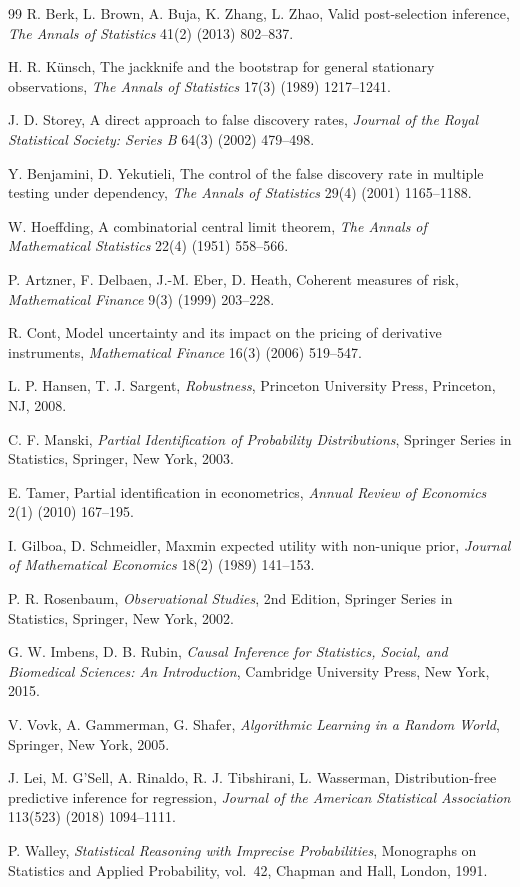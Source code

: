 \documentclass[preprint,12pt]{elsarticle}
\theoremstyle{definition}
\begin{document}
\begin{thebibliography}{99}
R. Berk, L. Brown, A. Buja, K. Zhang, L. Zhao, Valid post-selection inference,
\emph{The Annals of Statistics} 41(2) (2013) 802--837.

H. R. K\"unsch, The jackknife and the bootstrap for general stationary observations,
\emph{The Annals of Statistics} 17(3) (1989) 1217--1241.

J. D. Storey, A direct approach to false discovery rates,
\emph{Journal of the Royal Statistical Society: Series B} 64(3) (2002) 479--498.

Y. Benjamini, D. Yekutieli, The control of the false discovery rate in multiple testing under dependency,
\emph{The Annals of Statistics} 29(4) (2001) 1165--1188.

W. Hoeffding, A combinatorial central limit theorem,
\emph{The Annals of Mathematical Statistics} 22(4) (1951) 558--566.

P. Artzner, F. Delbaen, J.-M. Eber, D. Heath, Coherent measures of risk,
\emph{Mathematical Finance} 9(3) (1999) 203--228.

R. Cont, Model uncertainty and its impact on the pricing of derivative instruments,
\emph{Mathematical Finance} 16(3) (2006) 519--547.

L. P. Hansen, T. J. Sargent, \emph{Robustness}, Princeton University Press, Princeton, NJ, 2008.


C. F. Manski, \emph{Partial Identification of Probability Distributions}, Springer Series in Statistics, Springer, New York, 2003.

E. Tamer, Partial identification in econometrics,
\emph{Annual Review of Economics} 2(1) (2010) 167--195.

I. Gilboa, D. Schmeidler, Maxmin expected utility with non-unique prior,
\emph{Journal of Mathematical Economics} 18(2) (1989) 141--153.

P. R. Rosenbaum, \emph{Observational Studies}, 2nd Edition, Springer Series in Statistics, Springer, New York, 2002.

G. W. Imbens, D. B. Rubin, \emph{Causal Inference for Statistics, Social, and Biomedical Sciences: An Introduction}, Cambridge University Press, New York, 2015.

V. Vovk, A. Gammerman, G. Shafer, \emph{Algorithmic Learning in a Random World}, Springer, New York, 2005.

J. Lei, M. G'Sell, A. Rinaldo, R. J. Tibshirani, L. Wasserman, Distribution-free predictive inference for regression,
\emph{Journal of the American Statistical Association} 113(523) (2018) 1094--1111.

P. Walley, \emph{Statistical Reasoning with Imprecise Probabilities}, Monographs on Statistics and Applied Probability, vol.~42, Chapman and Hall, London, 1991.

\end{thebibliography}
\end{document}
